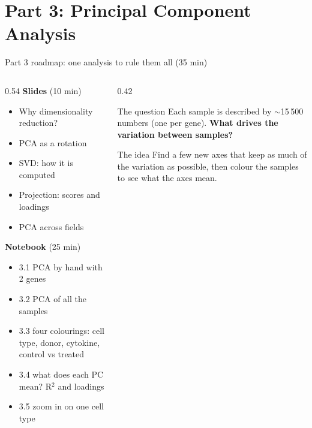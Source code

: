\section{Part 3: Principal Component Analysis}

\begin{frame}{Part 3 roadmap: one analysis to rule them all (35 min)}
  \footnotesize
  \begin{columns}[T]
    \begin{column}{0.54\linewidth}
      \textbf{Slides} (10 min)
      \begin{itemize}\setlength\itemsep{1pt}
        \item Why dimensionality reduction?
        \item PCA as a \alert{rotation}
        \item \alert{SVD}: how it is computed
        \item \alert{Projection}: scores and loadings
        \item PCA across fields
      \end{itemize}
      \vspace{0.1cm}
      \textbf{Notebook} (25 min)
      \begin{itemize}\setlength\itemsep{1pt}
        \item 3.1 PCA by hand with 2 genes
        \item 3.2 PCA of all the samples
        \item 3.3 four colourings: cell type, donor, cytokine, control vs treated
        \item 3.4 what does each PC mean? R$^2$ and loadings
        \item 3.5 zoom in on one cell type
      \end{itemize}
    \end{column}
    \begin{column}{0.42\linewidth}
      \begin{block}{The question}
        Each sample is described by $\sim$15\,500 numbers (one per gene). \textbf{What drives the variation between samples?}
      \end{block}
      \begin{block}{The idea}
        Find a few new axes that keep as much of the variation as possible, then \alert{colour the samples} to see what the axes mean.
      \end{block}
    \end{column}
  \end{columns}
\end{frame}

